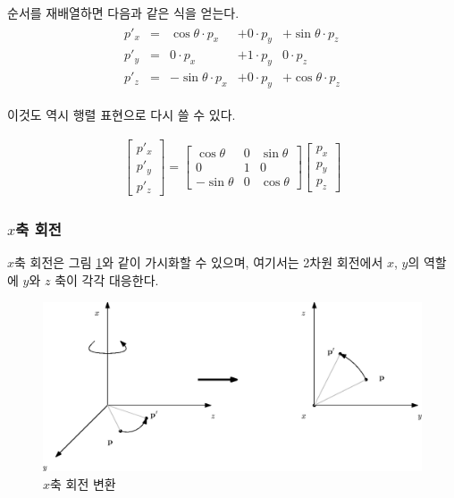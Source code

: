 순서를 재배열하면 다음과 같은 식을 얻는다.
\begin{eqnarray}
\begin{array}{clrrr}
p'_x  & = & \cos \theta \cdot p_x &+ 0 \cdot p_y &+ \sin \theta \cdot p_z  \\
p'_y  & =  &0 \cdot p_x &+ 1 \cdot p_y & 0 \cdot p_z \\
p'_z  & = &-\sin \theta \cdot p_x &+ 0 \cdot p_y  & + \cos \theta \cdot p_z 
\end{array}
\end{eqnarray}

이것도 역시 행렬 표현으로 다시 쓸 수 있다.

\begin{eqnarray}
\left [ \begin{array}{c} p'_x \\ p'_y \\ p'_z  \end{array} \right ] 
=
\left [ \begin{array}{rrr}
\cos \theta & 0 &  \sin \theta  \\
0 & 1 & 0 \\
- \sin \theta & 0 & \cos \theta
\end{array} \right ]
\left [ \begin{array}{c} p_x \\ p_y \\ p_z \end{array} \right ] 
\end{eqnarray}

\subsubsection{$x$축 회전}

$x$축 회전은 그림 \ref{fig:transform:xAxisRotation}와 같이 가시화할 수 있으며, 여기서는 2차원 회전에서 $x$, $y$의 역할에
$y$와 $z$ 축이 각각 대응한다. 

\begin{figure}[h!]
  \centering
    \includegraphics[width=15cm]{Math_transform/xAxisRotation.eps}
    \caption{$x$축 회전 변환}
    \label{fig:transform:xAxisRotation}
\end{figure}

